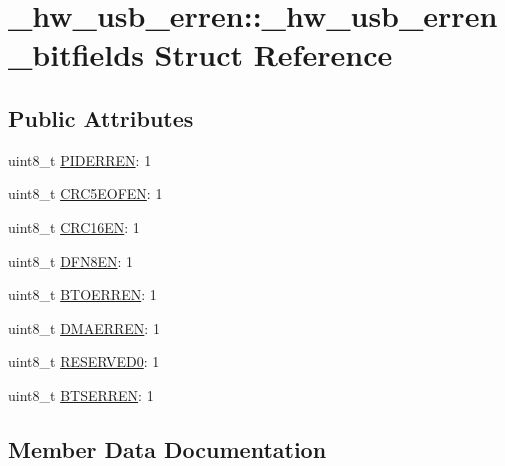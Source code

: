 \hypertarget{struct__hw__usb__erren_1_1__hw__usb__erren__bitfields}{}\section{\+\_\+hw\+\_\+usb\+\_\+erren\+:\+:\+\_\+hw\+\_\+usb\+\_\+erren\+\_\+bitfields Struct Reference}
\label{struct__hw__usb__erren_1_1__hw__usb__erren__bitfields}
\subsection*{Public Attributes}
\begin{DoxyCompactItemize}
\item 
uint8\+\_\+t \hyperlink{struct__hw__usb__erren_1_1__hw__usb__erren__bitfields_a2162e7bb0a2c8ef61cb2343a245b3d33}{P\+I\+D\+E\+R\+R\+EN}\+: 1
\item 
uint8\+\_\+t \hyperlink{struct__hw__usb__erren_1_1__hw__usb__erren__bitfields_a2e422d27ee3c5d89d61d12800c8eab86}{C\+R\+C5\+E\+O\+F\+EN}\+: 1
\item 
uint8\+\_\+t \hyperlink{struct__hw__usb__erren_1_1__hw__usb__erren__bitfields_a827f332c90560c391bacd9b7e6157dcf}{C\+R\+C16\+EN}\+: 1
\item 
uint8\+\_\+t \hyperlink{struct__hw__usb__erren_1_1__hw__usb__erren__bitfields_a8c4949b076a1fc11686cbac3194bdc2e}{D\+F\+N8\+EN}\+: 1
\item 
uint8\+\_\+t \hyperlink{struct__hw__usb__erren_1_1__hw__usb__erren__bitfields_a5d2a7c6ddbf67f14325738d13766e21a}{B\+T\+O\+E\+R\+R\+EN}\+: 1
\item 
uint8\+\_\+t \hyperlink{struct__hw__usb__erren_1_1__hw__usb__erren__bitfields_a828fdf5ada538308240892833d867996}{D\+M\+A\+E\+R\+R\+EN}\+: 1
\item 
uint8\+\_\+t \hyperlink{struct__hw__usb__erren_1_1__hw__usb__erren__bitfields_ad3c314872f2a237ac0c761fd9b849023}{R\+E\+S\+E\+R\+V\+E\+D0}\+: 1
\item 
uint8\+\_\+t \hyperlink{struct__hw__usb__erren_1_1__hw__usb__erren__bitfields_a21b73e0079d82346a61f763f692b5b1a}{B\+T\+S\+E\+R\+R\+EN}\+: 1
\end{DoxyCompactItemize}


\subsection{Member Data Documentation}
